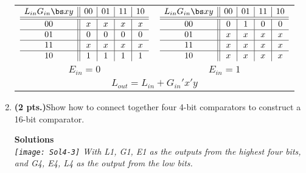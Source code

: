 \begin{enumerate}
\begin{onlysolution}
{                    \begin{tabular}{cc}
                        $
                        \begin{array} {c||c|c|c|c}
                            L_{in} G_{in}  \bs x  y & 00 & 01 & 11 & 10 \\ \hline \hline
                            00       & x  & x  & x  & x  \\ \hline
                            01       & 0  & 0  & 0  & 0  \\ \hline
                            11       & x  & x  & x  & x  \\ \hline
                            10       & 1  & 1  & 1  & 1  \\
                        \end{array}$
                        &
                        $
                        \begin{array} {c||c|c|c|c}
                            L_{in} G_{in}  \bs x  y & 00 & 01 & 11 & 10 \\ \hline \hline
                            00       & 0  & 1  & 0  & 0  \\ \hline
                            01       & x  & x  & x  & x  \\ \hline
                            11       & x  & x  & x  & x  \\ \hline
                            10       & x  & x  & x  & x  \\
                        \end{array}$  \\
                        $E_{in}=0$ & $E_{in}=1$ \\
                        \multicolumn{2}{c}{$L_{out} = L_{in} + G_{in}'x'y$} \\
                    \end{tabular}
                }
            \end{onlysolution}

        \item \textbf{ (2 pts.)}Show how to connect together four 4-bit comparators to
            construct a 16-bit comparator.

            \begin{onlysolution} \filbreak\textbf{Solutions}\\ \itshape{\texttt{[image: Sol4-3]} With L1, G1, E1 as the outputs from the highest four bits, and G4, E4, L4 as the output from the low bits.
                }
            \end{onlysolution}


\end{enumerate}
